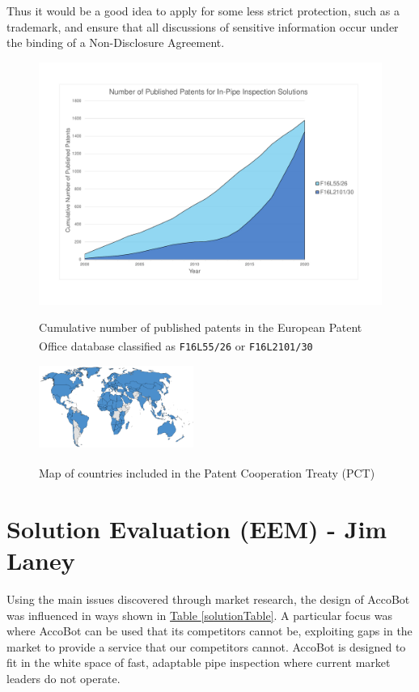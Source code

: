 \documentclass[11pt]{article}		%
\newlength{\imageheight}	 %
\newcommand{\supercite}[1]{\textsuperscript{\cite{#1}}}		%
\newcommand{\tableref}[1]{\hyperref[#1]{Table \ref*{#1}}}     %
\begin{document}
		Thus it would be a good idea to apply for some less strict protection, such as a trademark, and ensure that all discussions of sensitive information occur under the binding of a Non-Disclosure Agreement.
		\begin{figure}[h]
			\centering
			\begin{multicols}{2}
				\includegraphics[height=\imageheight]{patentGraph}
				\caption{Cumulative number of published patents in the European Patent Office database classified as \texttt{F16L55/26}\supercite{patent26} or \texttt{F16L2101/30}\supercite{patent30}}
				\label{patentGraph}
				\columnbreak
				\includegraphics[width=0.45\textwidth]{pctMap}
				\caption{Map of countries included in the Patent Cooperation Treaty (PCT)\supercite{pct2020states}}
				\label{pctMap}
			\end{multicols}
		\end{figure}
	
	\section[Solution Evaluation - EEM]{Solution Evaluation (EEM) - Jim Laney} \label{solutionEvaluation}
	
		Using the main issues discovered through market research, the design of AccoBot was influenced in ways shown in \tableref{solutionTable}.
		A particular focus was where AccoBot can be used that its competitors cannot be, exploiting gaps in the market to provide a service that our competitors cannot.
		AccoBot is designed to fit in the white space of fast, adaptable pipe inspection where current market leaders do not operate.%
		
\end{document}
